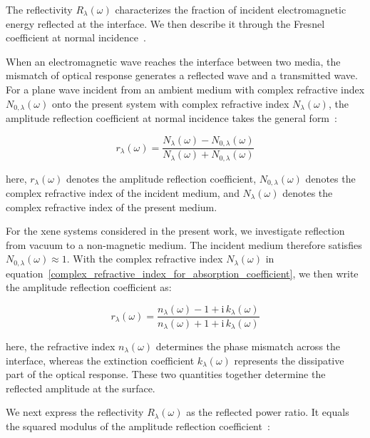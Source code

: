 The reflectivity $R_{\lambda}(\omega)$ characterizes the fraction of incident electromagnetic energy reflected at the interface.
We then describe it through the Fresnel coefficient at normal incidence~\cite{born2013principles,wooten2013optical,dressel2002electrodynamics,fox2010optical}.

When an electromagnetic wave reaches the interface between two media,
the mismatch of optical response generates a reflected wave and a transmitted wave.
For a plane wave incident from an ambient medium with complex refractive index $N_{0,\lambda}(\omega)$ onto the present system with complex refractive index $N_{\lambda}(\omega)$,
the amplitude reflection coefficient at normal incidence takes the general form~\cite{born2013principles,wooten2013optical}:

\begin{equation}
    r_{\lambda}(\omega) =
    \frac{N_{\lambda}(\omega)-N_{0,\lambda}(\omega)}
    {N_{\lambda}(\omega)+N_{0,\lambda}(\omega)}
\label{normal_incidence_amplitude_reflection_coefficient_general}
\end{equation}

here, $r_{\lambda}(\omega)$ denotes the amplitude reflection coefficient,
$N_{0,\lambda}(\omega)$ denotes the complex refractive index of the incident medium,
and $N_{\lambda}(\omega)$ denotes the complex refractive index of the present medium.

For the xene systems considered in the present work,
we investigate reflection from vacuum to a non-magnetic medium.
The incident medium therefore satisfies $N_{0,\lambda}(\omega)\approx 1$.
With the complex refractive index $N_{\lambda}(\omega)$ in equation~\eqref{complex_refractive_index_for_absorption_coefficient},
we then write the amplitude reflection coefficient as:

\begin{equation}
    r_{\lambda}(\omega) =
    \frac{n_{\lambda}(\omega)-1+\mathrm{i}\,k_{\lambda}(\omega)}
    {n_{\lambda}(\omega)+1+\mathrm{i}\,k_{\lambda}(\omega)}
\label{normal_incidence_amplitude_reflection_coefficient_vacuum_interface}
\end{equation}

here, the refractive index $n_{\lambda}(\omega)$ determines the phase mismatch across the interface,
whereas the extinction coefficient $k_{\lambda}(\omega)$ represents the dissipative part of the optical response.
These two quantities together determine the reflected amplitude at the surface.

We next express the reflectivity $R_{\lambda}(\omega)$ as the reflected power ratio.
It equals the squared modulus of the amplitude reflection coefficient~\cite{born2013principles,wooten2013optical,dressel2002electrodynamics}:

